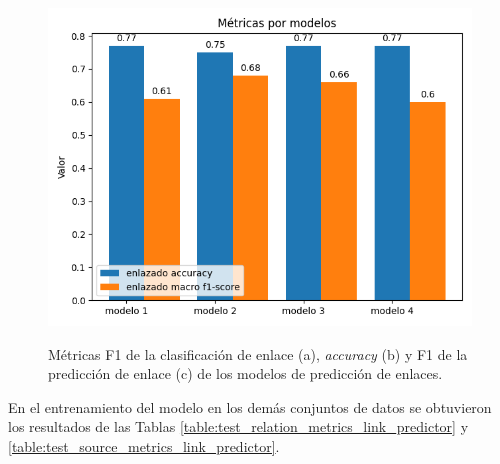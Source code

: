 \begin{figure}[h!]
\begin{center}
	\end{center}
	\begin{center}
		\includegraphics[scale=.4]{Graphics/persuasive_essays_all_linked_all_relation_linked.png}\\
	\end{center}
	\caption{Métricas F1 de la clasificación de enlace (a), \emph{accuracy} (b) y
			F1 de la predicción de enlace (c) de los modelos de predicción de enlaces.}
	\label{fig:link_prediction_model_metrics}
\end{figure}

En el entrenamiento del modelo en los demás conjuntos de datos se obtuvieron los resultados de las Tablas 
\ref{table:test_relation_metrics_link_predictor} y \ref{table:test_source_metrics_link_predictor}.

\begin{table}[h!]
	\begin{center}
	\caption{Métricas de predicción de relaciones de las pruebas del predictor de enlace.}\label{table:test_relation_metrics_link_predictor}
	\end{center}
\end{table}

